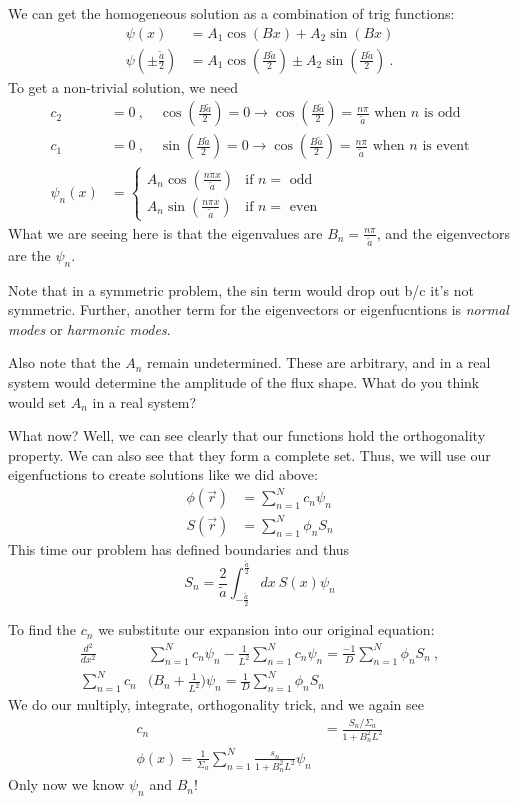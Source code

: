 \documentclass[12pt]{article}
\begin{document}
We can get the homogeneous solution as a combination of trig functions:
\begin{align*}
\psi(x) &= A_1 \cos(Bx) + A_2 \sin(Bx)\\
\psi(\pm \frac{\tilde{a}}{2}) &= A_1 \cos(\frac{B \tilde{a}}{2}) \pm A_2 \sin(\frac{B \tilde{a}}{2}) \:.
\end{align*}
To get a non-trivial solution, we need
\begin{align*}
c_2 &= 0 \:, \quad \cos(\frac{B \tilde{a}}{2}) = 0 \rightarrow \cos(\frac{B \tilde{a}}{2}) = \frac{n \pi}{\tilde{a}} \text{ when }n \text{ is odd}\\
c_1 &= 0 \:, \quad \sin(\frac{B \tilde{a}}{2}) = 0 \rightarrow \cos(\frac{B \tilde{a}}{2}) = \frac{n \pi}{\tilde{a}} \text{ when }n \text{ is event}\\
\psi_n(x) &= 
\left\{
	\begin{array}{ll}
		A_n \cos(\frac{n \pi x}{\tilde{a}})  & \mbox{if } n = \text{ odd} \\
		A_n \sin(\frac{n \pi x}{\tilde{a}}) & \mbox{if } n = \text{ even}
	\end{array}
	\right.
\end{align*}
%
What we are seeing here is that the eigenvalues are $B_n = \frac{n \pi}{\tilde{a}}$, and the eigenvectors are the $\psi_n$. 

Note that in a symmetric problem, the sin term would drop out b/c it's not symmetric. Further, another term for the eigenvectors or eigenfucntions is \textit{normal modes} or \textit{harmonic modes}. 

Also note that the $A_n$ remain undetermined. These are arbitrary, and in a real system would determine the amplitude of the flux shape. What do you think would set $A_n$ in a real system?

What now? Well, we can see clearly that our functions hold the orthogonality property. We can also see that they form a complete set. Thus, we will use our eigenfuctions to create solutions like we did above:
\begin{align*}
\phi(\vec{r}) &= \sum_{n=1}^N c_n \psi_n \\
S(\vec{r}) &= \sum_{n=1}^N \phi_n S_n
\end{align*}
This time our problem has defined boundaries and thus
\[
S_n = \frac{2}{\tilde{a}} \int_{-\frac{\tilde{a}}{2}}^{\frac{\tilde{a}}{2}} dx\: S(x) \psi_n
\]

To find the $c_n$ we substitute our expansion into our original equation:
\begin{align*}
\frac{d^2 }{dx^2} &\sum_{n=1}^N c_n \psi_n - \frac{1}{L^2} \sum_{n=1}^N c_n \psi_n = \frac{-1}{D}\sum_{n=1}^N \phi_n S_n\:,\\
%
\sum_{n=1}^N c_n& \bigl( B_n + \frac{1}{L^2}\bigr)\psi_n = \frac{1}{D}\sum_{n=1}^N \phi_n S_n
\end{align*}
We do our multiply, integrate, orthogonality trick, and we again see
\begin{align*}
c_n &= \frac{S_n / \Sigma_a}{1 + B_n^2  L^2} \\
\phi(x) = \frac{1}{\Sigma_a} \sum_{n=1}^N \frac{s_n}{1 + B_n^2  L^2} \psi_n
\end{align*}
Only now we know $\psi_n$ and $B_n$!
\end{document}
